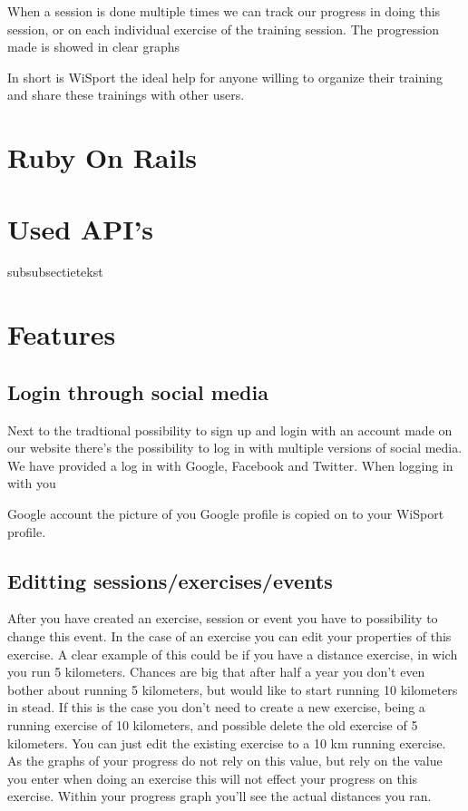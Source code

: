 \documentclass[11pt,a4paper]{scrartcl}
\begin{document}
When a session is done multiple times we can track our progress in doing this session, or on each individual exercise of the training session. The progression made is 
showed in clear graphs

In short is WiSport the ideal help for anyone willing to organize their training and share these trainings with other users.

\section{Ruby On Rails}
\section{Used API's}
subsubsectietekst
\section{Features}
\subsection{Login through social media}
Next to the tradtional possibility to sign up and login with an account made on our
website there's the possibility to log in with multiple versions of social media. We
have provided a log in with Google, Facebook and Twitter. When logging in with you

Google account the picture of you Google profile is copied on to your WiSport profile.

\subsection{Editting sessions/exercises/events}
After you have created an exercise, session or event you have to possibility to change
this event. In the case of an exercise you can edit your properties of this exercise.
A clear example of this could be if you have a distance exercise, in wich you run 5
kilometers. Chances are big that after half a year you don't even bother about running
5 kilometers, but would like to start running 10 kilometers in stead. If this is the case
you don't need to create a new exercise, being a running exercise of 10 kilometers, and
possible delete the old exercise of 5 kilometers. You can just edit the existing exercise
to a 10 km running exercise. As the graphs of your progress do not rely on this value,
but rely on the value you enter when doing an exercise this will not effect your progress
on this exercise. Within your progress graph you'll see the actual distances you ran.
\end{document}
